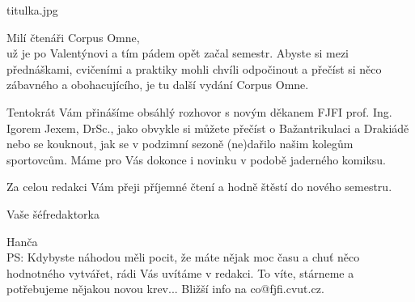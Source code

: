 \documentclass{CorpusOmne}
\begin{document}
\begin{COtitlepage}[70]{titulka.jpg}
\vfill
{}
\end{COtitlepage}


\COeditorial
{}
{Milí čtenáři Corpus Omne,\\[4mm]
už je po Valentýnovi a tím pádem opět začal semestr. Abyste si mezi přednáškami, cvičeními a praktiky mohli chvíli odpočinout a přečíst si něco zábavného a obohacujícího, je tu další vydání Corpus Omne.

Tentokrát Vám přinášíme obsáhlý rozhovor s novým děkanem FJFI prof. Ing. Igorem Jexem, DrSc., jako obvykle si můžete přečíst o Bažantrikulaci a Drakiádě nebo se kouknout, jak se v podzimní sezoně (ne)dařilo našim kolegům sportovcům. Máme pro Vás dokonce i novinku v podobě jaderného komiksu.

Za celou redakci Vám přeji příjemné čtení a hodně štěstí do nového semestru.

\hfill Vaše šéfredaktorka

\hfill Hanča
\\[4mm]
PS: Kdybyste náhodou měli pocit, že máte nějak moc času a chuť něco hodnotného vytvářet, rádi Vás uvítáme v redakci. To víte, stárneme a potřebujeme nějakou novou krev... Bližší info na co@fjfi.cvut.cz.
}

\COtableofcontents
\pagebreak


\begin{COcolumn}
\lipsum
{}
\end{COcolumn}

\begin{COcolumn}[2]
\lipsum[4]
\lipsum[5]
\lipsum
\lipsum
{}
\end{COcolumn}


\begin{COcolumn}
\lipsum[1]
\lipsum[2]
\end{COcolumn}
\end{document}
